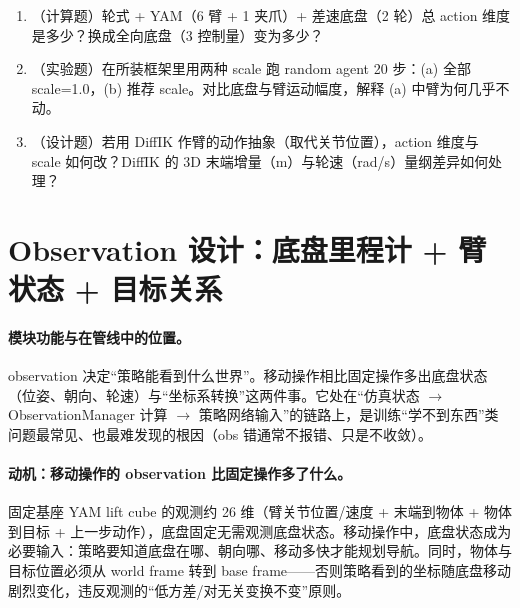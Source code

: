 
\begin{practice}[混合动作]
\begin{enumerate}
\item （计算题）轮式 + YAM（6 臂 + 1 夹爪）+ 差速底盘（2 轮）总 action 维度是多少？换成全向底盘（3 控制量）变为多少？
\item （实验题）在所装框架里用两种 scale 跑 random agent 20 步：(a) 全部 scale=1.0，(b) 推荐 scale。对比底盘与臂运动幅度，解释 (a) 中臂为何几乎不动。
\item （设计题）若用 DiffIK 作臂的动作抽象（取代关节位置），action 维度与 scale 如何改？DiffIK 的 3D 末端增量（m）与轮速（rad/s）量纲差异如何处理？
\end{enumerate}
\end{practice}

\section{Observation 设计：底盘里程计 + 臂状态 + 目标关系}
\label{sec:rlmc-wh-obs}

\paragraph{模块功能与在管线中的位置。}observation 决定“策略能看到什么世界”。移动操作相比固定操作多出底盘状态（位姿、朝向、轮速）与“坐标系转换”这两件事。它处在“仿真状态 $\to$ ObservationManager 计算 $\to$ 策略网络输入”的链路上，是训练“学不到东西”类问题最常见、也最难发现的根因（obs 错通常不报错、只是不收敛）。

\paragraph{动机：移动操作的 observation 比固定操作多了什么。}固定基座 YAM lift cube 的观测约 26 维（臂关节位置/速度 + 末端到物体 + 物体到目标 + 上一步动作），底盘固定无需观测底盘状态。移动操作中，底盘状态成为必要输入：策略要知道底盘在哪、朝向哪、移动多快才能规划导航。同时，物体与目标位置必须从 world frame 转到 base frame——否则策略看到的坐标随底盘移动剧烈变化，违反观测的“低方差/对无关变换不变”原则。

